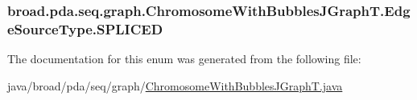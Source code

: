 \hypertarget{enumbroad_1_1pda_1_1seq_1_1graph_1_1_chromosome_with_bubbles_j_graph_t_1_1_edge_source_type_a331268f2fdc2768b1af5eaf85088c81c}{
\subsubsection[{S\+P\+L\+I\+C\+E\+D}]{\setlength{\rightskip}{0pt plus 5cm}broad.\+pda.\+seq.\+graph.\+Chromosome\+With\+Bubbles\+J\+Graph\+T.\+Edge\+Source\+Type.\+S\+P\+L\+I\+C\+E\+D}}\label{enumbroad_1_1pda_1_1seq_1_1graph_1_1_chromosome_with_bubbles_j_graph_t_1_1_edge_source_type_a331268f2fdc2768b1af5eaf85088c81c}


The documentation for this enum was generated from the following file\+:\begin{DoxyCompactItemize}
\item 
java/broad/pda/seq/graph/\hyperlink{_chromosome_with_bubbles_j_graph_t_8java}{Chromosome\+With\+Bubbles\+J\+Graph\+T.\+java}\end{DoxyCompactItemize}

